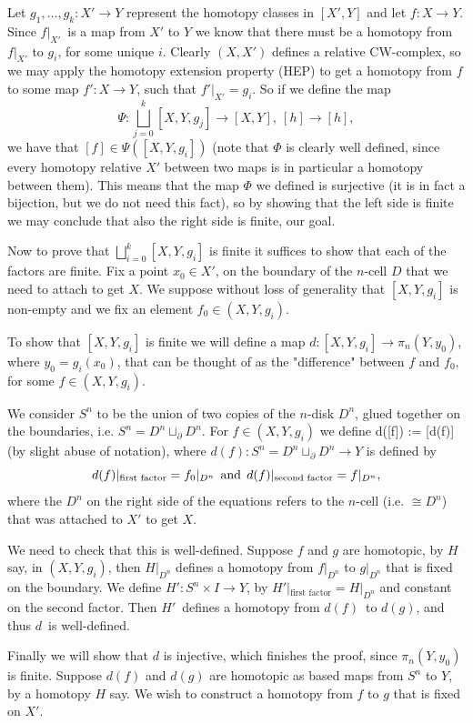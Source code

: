 \documentclass[a4paper,11pt,english]{article}
\begin{document}
\begin{exercise}[1]
Let $g_1,\dots, g_k: X' \to Y$ represent the homotopy classes in $[X',Y]$ and let $f: X \to Y$. 
Since $f|_{X'}$ is a map from $X'$ to $Y$ we know that there must be a homotopy from $f|_{X'}$
to $g_i$, for some unique $i$. Clearly $(X,X')$ defines a relative CW-complex, so we may apply the 
homotopy extension property (HEP) to get a homotopy from $f$ to some map $f': X\to Y$, 
such that $f'|_{X'} = g_i$. So if we define the map
\[ \Psi : \bigsqcup_{j=0}^k [X,Y,g_j] \to [X,Y],\ [h] \to [h], \]
we have that $[f] \in \Psi([X,Y,g_i])$ (note that $\Phi$ is clearly well defined, since every homotopy relative $X'$ between two maps is in particular a homotopy between them). This means that the map $\Phi$ we defined is surjective (it is in fact a bijection, but we do not need this fact), so by showing that 
the left side is finite we may conclude that also the right side is finite, our goal.

Now to prove that $\bigsqcup_{i=0}^k [X,Y,g_i]$ is finite it suffices to show that each of the factors are finite. Fix a point $x_0 \in X'$, on the boundary of the $n$-cell $D$ that we need to attach to get $X$. We suppose without loss of generality that $[X,Y,g_i]$ is non-empty and we fix an element $f_0 \in (X,Y,g_i)$.

To show that $[X,Y,g_i]$ is finite we will define a map $d: [X,Y,g_i] \to \pi_n(Y,y_0)$, where $y_0 = g_i(x_0)$, that 
can be thought of as the "difference" between $f$ and $f_0$, for some $f\in(X,Y,g_i)$.

We consider $S^n$ to be the union of two copies of the $n$-disk $D^n$, glued together on the boundaries, i.e. 
$S^n = D^n \sqcup_\partial D^n$. For $f \in (X,Y,g_i)$ we define d([f]) := [d(f)] (by slight abuse of notation),
where $d(f): S^n = D^n \sqcup_\partial D^n \to Y$ is defined by
\[ d(f)|_{\text{first factor}} = f_0|_{D^n} \:\:\text{and}\:\: d(f)|_{\text{second factor}} = f|_{D^n}, \]
where the $D^n$ on the right side of the equations refers to the $n$-cell (i.e. $\cong D^n$) that was attached to $X'$ to get $X$.

We need to check that this is well-defined. Suppose $f$ and $g$ are homotopic, by $H$ say, in $(X,Y,g_i)$, then $H|_{D^n}$ defines a homotopy from $f|_{D^n}$ to $g|_{D^n}$
that is fixed on the boundary. We define $H': S^n\times I \to Y$, by $H'|_{\text{first factor}} = H|_{D^n}$ and constant on the second 
factor. Then $H'$ defines a homotopy from $d(f)$ to $d(g)$, and thus $d$ is well-defined.

Finally we will show that $d$ is injective, which finishes the proof, since $\pi_n(Y,y_0)$ is finite. Suppose $d(f)$ and $d(g)$ are homotopic as based maps from $S^n$ to $Y$, by a homotopy $H$ say. We wish to construct a homotopy from $f$ to $g$ that is fixed on $X'$.


\end{exercise}
\end{document}
